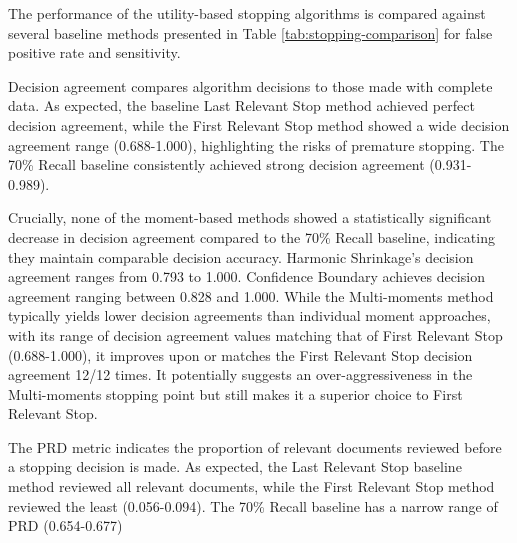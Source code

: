 \documentclass[sigconf,natbib=true,anonymous=true]{acmart}
\begin{document}
The performance of the utility-based stopping algorithms is compared against several baseline methods presented in Table \ref{tab:stopping-comparison} for false positive rate and sensitivity.



Decision agreement compares algorithm decisions to those made with complete data. As expected, the baseline Last Relevant Stop method achieved perfect decision agreement, while the First Relevant Stop method showed a wide decision agreement range (0.688-1.000), highlighting the risks of premature stopping. The 70\% Recall baseline consistently achieved strong decision agreement (0.931-0.989).

Crucially, none of the moment-based methods showed a statistically significant decrease in decision agreement compared to the 70\% Recall baseline, indicating they maintain comparable decision accuracy. Harmonic Shrinkage's decision agreement ranges from 0.793 to 1.000. Confidence Boundary achieves decision agreement ranging between 0.828 and 1.000. While the Multi-moments method typically yields lower decision agreements than individual moment approaches, with its range of decision agreement values matching that of First Relevant Stop (0.688-1.000), it improves upon or matches the First Relevant Stop decision agreement 12/12 times. It potentially suggests an over-aggressiveness in the Multi-moments stopping point but still makes it a superior choice to First Relevant Stop.

The PRD metric indicates the proportion of relevant documents reviewed before a stopping decision is made. As expected, the Last Relevant Stop baseline method reviewed all relevant documents, while the First Relevant Stop method reviewed the least (0.056-0.094). The 70\% Recall baseline has a narrow range of PRD (0.654-0.677)
\end{document}

